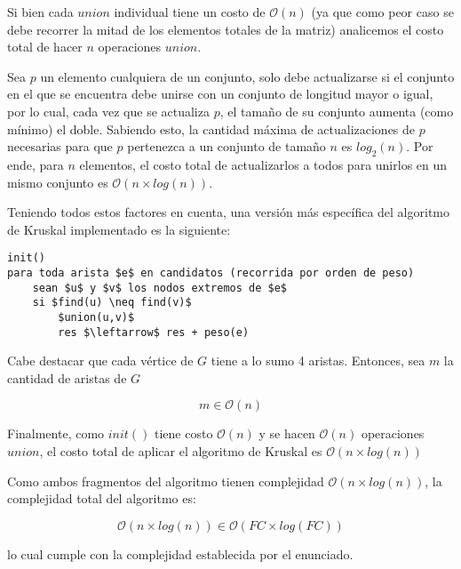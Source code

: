 Si bien cada $union$ individual tiene un costo de $\mathcal{O}(n)$ (ya que como peor caso se debe recorrer la mitad de los elementos totales de la matriz) analicemos el costo total de hacer $n$ operaciones $union$.

Sea $p$ un elemento cualquiera de un conjunto, solo debe actualizarse si el conjunto en el que se encuentra debe unirse con un conjunto de longitud mayor o igual, por lo cual, cada vez que se actualiza $p$, el tamaño de su conjunto aumenta (como mínimo) el doble. Sabiendo esto, la cantidad máxima de actualizaciones de $p$ necesarias para que $p$ pertenezca a un conjunto de tamaño $n$ es $log_2(n)$. Por ende, para $n$ elementos, el costo total de actualizarlos a todos para unirlos en un mismo conjunto es $\mathcal{O}(n \times log(n))$.

Teniendo todos estos factores en cuenta, una versión más específica del algoritmo de Kruskal implementado es la siguiente:

\begin{lstlisting}
init()
para toda arista $e$ en candidatos (recorrida por orden de peso)
	sean $u$ y $v$ los nodos extremos de $e$
	si $find(u) \neq find(v)$
		$union(u,v)$
		res $\leftarrow$ res + peso(e)
\end{lstlisting}

Cabe destacar que cada vértice de $G$ tiene a lo sumo 4 aristas. Entonces, sea $m$ la cantidad de aristas de $G$

$$m \in \mathcal{O}(n)$$

Finalmente, como $init()$ tiene costo $\mathcal{O}(n)$ y se hacen $\mathcal{O}(n)$ operaciones $union$, el costo total de aplicar el algoritmo de Kruskal es $\mathcal{O}(n \times log(n))$

Como ambos fragmentos del algoritmo tienen complejidad $\mathcal{O}(n \times log(n))$, la complejidad total del algoritmo es:

$$\mathcal{O}(n \times log(n)) \in \mathcal{O}(FC \times log(FC))$$

lo cual cumple con la complejidad establecida por el enunciado. \QEDB
